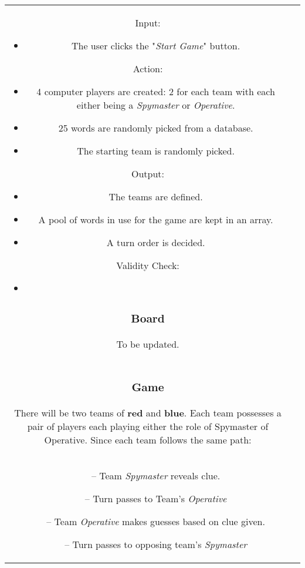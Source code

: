 \documentclass[10pt, a4paper]{article}
\begin{document}
\begin{table}[htbp]
\begin{center}
\begin{tabular}{| c | c |}
		Input:
		    \begin{itemize}
		        \item The user clicks the "\textit{Start Game}" button.
		    \end{itemize}
	    
		Action:
		    \begin{itemize}
		        \item 4 computer players are created: 2 for each team with each either being a \textit{Spymaster} or \textit{Operative}.
		        \item 25 words are randomly picked from a database.
		        \item The starting team is randomly picked.
		    \end{itemize}
		
		Output:
		    \begin{itemize}
		        \item The teams are defined.
		        \item A pool of words in use for the game are kept in an array.
		        \item A turn order is decided.
		    \end{itemize}
		    
		Validity Check:
		    \begin{itemize}
		        \item 
		    \end{itemize}
		
		\subsubsection{Board}
		
		To be updated.\\
		
		\subsubsection{Game}
		
		There will be two teams of \textbf{red} and \textbf{blue}. Each team possesses a pair of players each playing either the role of Spymaster of Operative. Since each team follows the same path:\\
		
		\begin{itemize}
			\item [--] Team \textit{Spymaster} reveals clue.
			\item [--] Turn passes to Team's \textit{Operative}
			\item [--] Team \textit{Operative} makes guesses based on clue given.
			\item [--] Turn passes to opposing team's \textit{Spymaster}
		\end{itemize}
	

\end{tabular}
\end{center}
\end{table}
\end{document}

